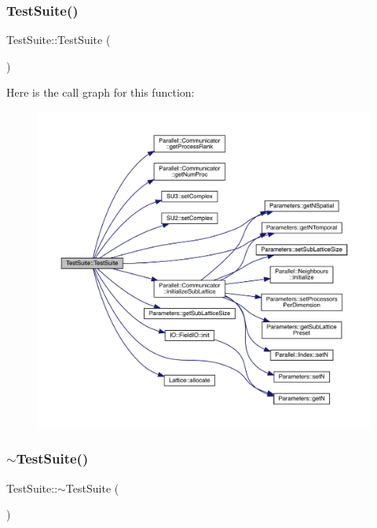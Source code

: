 \subsubsection{\texorpdfstring{TestSuite()}{TestSuite()}}
{\footnotesize\ttfamily Test\+Suite\+::\+Test\+Suite (\begin{DoxyParamCaption}{ }\end{DoxyParamCaption})}

Here is the call graph for this function\+:
\nopagebreak
\begin{figure}[H]
\begin{center}
\leavevmode
\includegraphics[width=350pt]{class_test_suite_af7291e6d8b53443604ee0c1fcf1fadfc_cgraph}
\end{center}
\end{figure}
\mbox{\label{class_test_suite_a1a4603e985169c62d251876dd3910b5e}} 
\subsubsection{\texorpdfstring{$\sim$TestSuite()}{~TestSuite()}}
{\footnotesize\ttfamily Test\+Suite\+::$\sim$\+Test\+Suite (\begin{DoxyParamCaption}{ }\end{DoxyParamCaption})}



